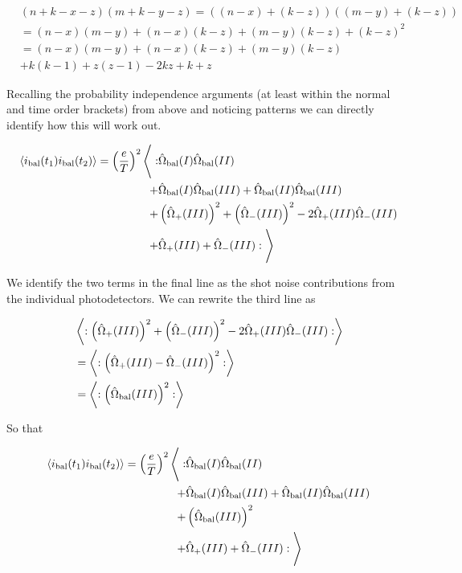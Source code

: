 \documentclass[12pt]{article}
\begin{document}
\begin{align}
&(n+k-x-z)(m+k-y-z) = ((n-x) + (k-z))((m-y) + (k-z)) \\
&=(n-x)(m-y) + (n-x)(k-z) + (m-y)(k-z) + (k-z)^2\\
&= (n-x)(m-y) + (n-x)(k-z) + (m-y)(k-z)\\
&+ k(k-1) + z(z-1) - 2 kz + k + z
\end{align}

Recalling the probability independence arguments (at least within the normal and time order brackets) from above and noticing patterns we can directly identify how this will work out.

\begin{align}
\Braket{i_{\text{bal}}(t_1)i_{\text{bal}}(t_2)} = \left(\frac{e}{T}\right)^2 \Bigg \langle: &\hat{\Omega}_{\text{bal}}(I) \hat{\Omega}_{\text{bal}}(II)\\
+ &\hat{\Omega}_{\text{bal}}(I) \hat{\Omega}_{\text{bal}}(III) + \hat{\Omega}_{\text{bal}}(II) \hat{\Omega}_{\text{bal}}(III)\\
+ &\left(\hat{\Omega}_+(III)\right)^2 + \left(\hat{\Omega}_-(III)\right)^2 - 2 \hat{\Omega}_+(III) \hat{\Omega}_-(III)\\
+&\hat{\Omega}_+(III) + \hat{\Omega}_-(III)
:\Bigg \rangle
\end{align}

We identify the two terms in the final line as the shot noise contributions from the individual photodetectors. We can rewrite the third line as

\begin{align}
&\Braket{:\left(\hat{\Omega}_+(III)\right)^2 + \left(\hat{\Omega}_-(III)\right)^2 - 2 \hat{\Omega}_+(III) \hat{\Omega}_-(III):}\\
&= \Braket{:\left(\hat{\Omega}_+(III) - \hat{\Omega}_-(III)\right)^2 :}\\
&= \Braket{:\left(\hat{\Omega}_{\text{bal}}(III) \right)^2 :}
\end{align}

So that

\begin{align}
\Braket{i_{\text{bal}}(t_1)i_{\text{bal}}(t_2)} = \left(\frac{e}{T}\right)^2 \Bigg \langle: &\hat{\Omega}_{\text{bal}}(I) \hat{\Omega}_{\text{bal}}(II)\\
+ &\hat{\Omega}_{\text{bal}}(I) \hat{\Omega}_{\text{bal}}(III) + \hat{\Omega}_{\text{bal}}(II) \hat{\Omega}_{\text{bal}}(III)\\
+ &\left(\hat{\Omega}_{\text{bal}}(III) \right)^2\\
+&\hat{\Omega}_+(III) + \hat{\Omega}_-(III)
:\Bigg \rangle
\end{align}
\end{document}
